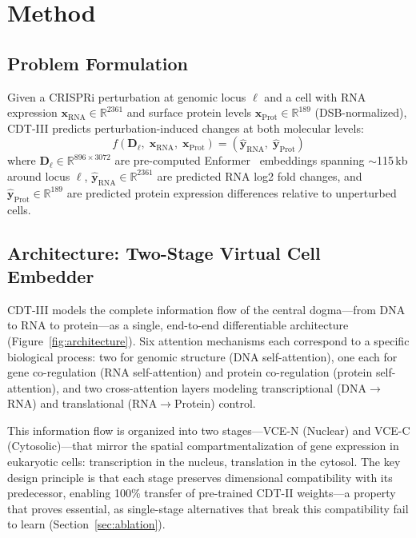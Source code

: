 \documentclass{article}
\begin{document}
\section{Method}

\subsection{Problem Formulation}

Given a CRISPRi perturbation at genomic locus $\ell$ and a cell with RNA expression $\mathbf{x}_{\text{RNA}} \in \mathbb{R}^{2361}$ and surface protein levels $\mathbf{x}_{\text{Prot}} \in \mathbb{R}^{189}$ (DSB-normalized), CDT-III predicts perturbation-induced changes at both molecular levels:
\begin{equation}
f(\mathbf{D}_\ell,\; \mathbf{x}_{\text{RNA}},\; \mathbf{x}_{\text{Prot}}) = (\hat{\mathbf{y}}_{\text{RNA}},\; \hat{\mathbf{y}}_{\text{Prot}})
\end{equation}
where $\mathbf{D}_\ell \in \mathbb{R}^{896 \times 3072}$ are pre-computed Enformer~\citep{avsec2021enformer} embeddings spanning $\sim$115\,kb around locus $\ell$, $\hat{\mathbf{y}}_{\text{RNA}} \in \mathbb{R}^{2361}$ are predicted RNA log2 fold changes, and $\hat{\mathbf{y}}_{\text{Prot}} \in \mathbb{R}^{189}$ are predicted protein expression differences relative to unperturbed cells.

\subsection{Architecture: Two-Stage Virtual Cell Embedder}

CDT-III models the complete information flow of the central dogma---from DNA to RNA to protein---as a single, end-to-end differentiable architecture (Figure~\ref{fig:architecture}). Six attention mechanisms each correspond to a specific biological process: two for genomic structure (DNA self-attention), one each for gene co-regulation (RNA self-attention) and protein co-regulation (protein self-attention), and two cross-attention layers modeling transcriptional (DNA$\to$RNA) and translational (RNA$\to$Protein) control.

This information flow is organized into two stages---VCE-N (Nuclear) and VCE-C (Cytosolic)---that mirror the spatial compartmentalization of gene expression in eukaryotic cells: transcription in the nucleus, translation in the cytosol. The key design principle is that each stage preserves dimensional compatibility with its predecessor, enabling 100\% transfer of pre-trained CDT-II weights---a property that proves essential, as single-stage alternatives that break this compatibility fail to learn (Section~\ref{sec:ablation}).
\end{document}
